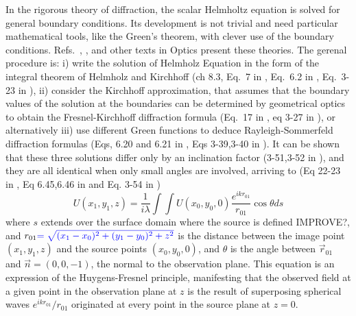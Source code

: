 \documentclass{iucr}              %
\newcommand{\inblue}[1]{{\color{blue}#1}}
\newcommand{\inred}[1]{{\color{red}#1}}
\begin{document}
In the rigorous theory of diffraction, the scalar Helmholtz equation is solved for general boundary conditions. Its development is not trivial and need particular mathematical tools, like the Green's theorem, with clever use of the boundary conditions. Refs.~\cite{bornwolf}, \cite{nieto}, \cite{goodmanfourier} and other texts in Optics present these theories. The gerenal procedure is: i) write the solution of Helmholz Equation in the form of the integral theorem of Helmholz and Kirchhoff 
\inblue{(ch 8.3, Eq.~7 in \cite{bornwolf}, Eq.~6.2 in \cite{nieto}, Eq.~3-23 in \cite{goodmanfourier} )},
ii) consider the Kirchhoff approximation, that assumes that the boundary values of the solution at the boundaries can be determined by geometrical optics to obtain the Fresnel-Kirchhoff diffraction formula 
\inblue{(Eq.~17 in \cite{bornwolf}, eq 3-27 in \cite{goodmanfourier})},
or alternatively iii) use different Green functions to deduce Rayleigh-Sommerfeld diffraction formulas
\inblue{(Eqs, 6.20 and 6.21 in \cite{nieto}, Eqs 3-39,3-40 in \cite{goodmanfourier})}. 
It can be shown  that these three solutions differ only by an inclination factor 
\inblue{(3-51,3-52 in \cite{goodmanfourier})},
and they are all identical when only small angles are involved, arriving to 
\inblue{(Eq 22-23 in \cite{bornwolf}, Eq 6.45,6.46 in \cite{nieto} and Eq. 3-54 in \cite{goodmanfourier})}
\begin{equation}\label{eq: Huygens}
 U(x_1,y_1,z) = \frac{1}{i \lambda} \int \int U(x_0,y_0,0) \frac{e^{i k r_{01}}}{r_{01}} \cos \theta ds
\end{equation}
\inred{where $s$ extends over the surface domain where the source is defined IMPROVE?}, and $r_{01}\inblue{=\sqrt{(x_1-x_0)^2+(y_1-y_0)^2+z^2}}$ is the distance between the image point $(x_1,y_1,z)$ and the source points $(x_0,y_0,0)$, and $\theta$ is the angle between $\vec{r}_01$ and $\vec{n}=(0,0,-1)$, the normal to the observation plane. This equation is an expression of the Huygens-Fresnel principle, manifesting that the observed field at a given point in the observation plane at $z$ is the result of superposing spherical waves $e^{i k r_{01}}/r_{01}$ originated at every point in the source plane at $z=0$. 
\end{document}
